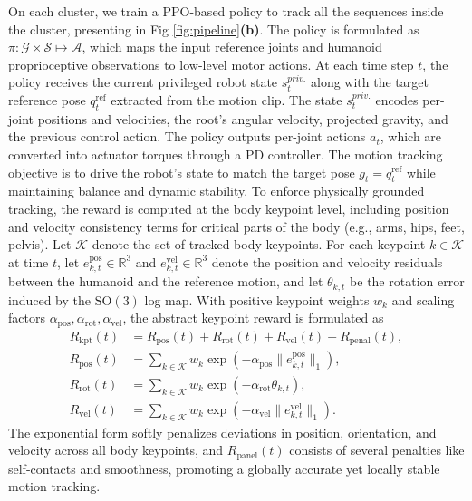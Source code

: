 On each cluster, we train a PPO-based policy to track all the sequences inside the cluster, presenting in Fig \ref{fig:pipeline}\textbf{(b)}. The policy is formulated as $\pi: \mathcal{G} \times \mathcal{S} \mapsto \mathcal{A}$, which maps the input reference joints and humanoid proprioceptive observations to low-level motor actions. At each time step $t$, the policy receives the current privileged robot state $s_t^{priv.}$ along with the target reference pose $q_t^{\text{ref}}$ extracted from the motion clip. The state $s_t^{priv.}$ encodes per-joint positions and velocities, the root’s angular velocity, projected gravity, and the previous control action. The policy outputs per-joint actions $a_t$, which are converted into actuator torques through a PD controller. 
The motion tracking objective is to drive the robot's state to match the 
target pose $g_t = q_t^{\text{ref}}$ while maintaining balance and dynamic stability. 
To enforce physically grounded tracking, the reward is computed at the body keypoint level, including position and velocity consistency terms for critical parts of the body (e.g., arms, hips, feet, pelvis). Let $\mathcal{K}$ denote the set of tracked body keypoints. For each keypoint $k\!\in\!\mathcal{K}$ at time $t$, let $e^{\text{pos}}_{k,t}\!\in\!\mathbb{R}^3$ and $e^{\text{vel}}_{k,t}\!\in\!\mathbb{R}^3$ denote the position and velocity residuals between the humanoid and the reference motion, and let $\theta_{k,t}$ be the rotation error induced by the $\mathrm{SO}(3)$ log map.  With positive keypoint weights $w_k$ and scaling factors 
$\alpha_{\text{pos}}, \alpha_{\text{rot}}, \alpha_{\text{vel}}$,  
the abstract keypoint reward is formulated as
\begin{equation}
\begin{aligned}
R_{\text{kpt}}(t) &= R_{\text{pos}}(t) + R_{\text{rot}}(t) + R_{\text{vel}}(t) + R_{\text{penal}}(t),\\
R_{\text{pos}}(t) &= \sum_{k\in\mathcal{K}} w_k \exp\!\left(-\alpha_{\text{pos}}\|e^{\text{pos}}_{k,t}\|_{1}\right),\\
R_{\text{rot}}(t) &= \sum_{k\in\mathcal{K}} w_k \exp\!\left(-\alpha_{\text{rot}}\theta_{k,t}\right),\\
R_{\text{vel}}(t) &= \sum_{k\in\mathcal{K}} w_k \exp\!\left(-\alpha_{\text{vel}}\|e^{\text{vel}}_{k,t}\|_{1}\right).
\end{aligned}
\end{equation}
The exponential form softly penalizes deviations in position, orientation, 
and velocity across all body keypoints, and $R_{\text{panel}}(t)$ consists of several penalties like self-contacts and smoothness, promoting a globally accurate yet locally stable motion tracking.


